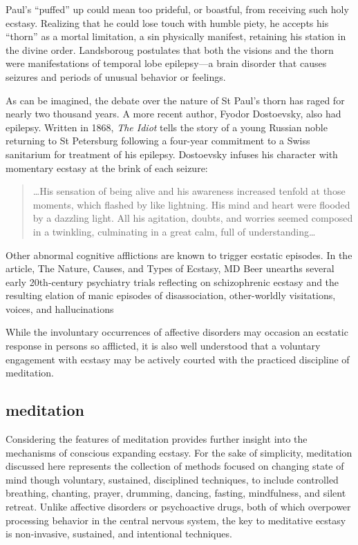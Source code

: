 \documentclass{UIdahoMastersThesis}
\begin{document}
Paul's ``puffed'' up could mean too prideful, or boastful, from receiving such holy ecstasy. Realizing that he could lose touch with humble piety, he accepts his ``thorn'' as a mortal limitation, a sin physically manifest, retaining his station in the divine order. Landsboroug postulates that both the visions and the thorn were manifestations of temporal lobe epilepsy---a brain disorder that causes seizures and periods of unusual behavior or feelings.

As can be imagined, the debate over the nature of St Paul's thorn has raged for nearly two thousand years. A more recent author, Fyodor Dostoevsky, also had epilepsy. Written in 1868, \emph{The Idiot} tells the story of a young Russian noble returning to St Petersburg following a four-year commitment to a Swiss sanitarium for treatment of his epilepsy. Dostoevsky infuses his character with momentary ecstasy at the brink of each seizure:

\begin{quote}
{\ldots His sensation of being alive and his awareness increased tenfold at those moments, which flashed by like lightning. His mind and heart were flooded by a dazzling light. All his agitation, doubts, and worries seemed composed in a twinkling, culminating in a great calm, full of understanding\ldots}\cite{bible_new_1984}
\end{quote}

Other abnormal cognitive afflictions are known to trigger ecstatic episodes. In the article, The Nature, Causes, and Types of Ecstasy, MD Beer unearths several early 20th-century psychiatry trials reflecting on schizophrenic ecstasy and the resulting elation of manic episodes of disassociation, other-worldly visitations, voices, and hallucinations \cite{beer_nature_2000}

While the involuntary occurrences of affective disorders may occasion an ecstatic response in persons so afflicted, it is also well understood that a voluntary engagement with ecstasy may be actively courted with the practiced discipline of meditation.

\newpage
\noindent
{%
\setlength{\fboxsep}{0pt}%
\setlength{\fboxrule}{1.5pt}%
%
}%
\subsection{meditation}

Considering the features of meditation provides further insight into the mechanisms of conscious expanding ecstasy. For the sake of simplicity, meditation discussed here represents the collection of methods focused on changing state of mind though voluntary, sustained, disciplined techniques, to include controlled breathing, chanting, prayer, drumming, dancing, fasting, mindfulness, and silent retreat. Unlike affective disorders or psychoactive drugs, both of which overpower processing behavior in the central nervous system, the key to meditative ecstasy is non-invasive, sustained, and intentional techniques.
\end{document}
